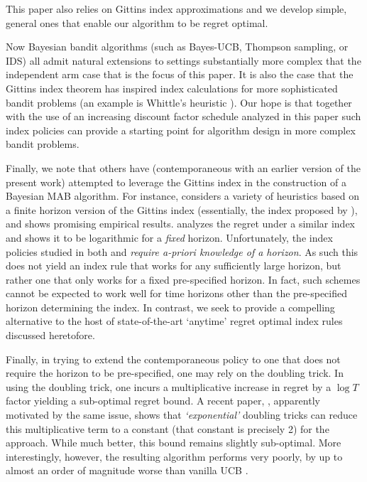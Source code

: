 This paper also relies on Gittins index approximations and we develop simple, general ones that enable our algorithm to be regret optimal. 

{\color{blue}
Now Bayesian bandit algorithms (such as Bayes-UCB, Thompson sampling, or IDS) all admit natural extensions to settings substantially more complex that the independent arm case that is the focus of this paper. It is also the case that the Gittins index theorem has inspired index calculations for more sophisticated bandit problems (an example is Whittle's heuristic  \citep{whittle1988restless}). Our hope is that together with the use of an increasing discount factor schedule analyzed in this paper such index policies can provide a starting point for algorithm design in more complex bandit problems. 
}

Finally, we note that others have (contemporaneous with an earlier version of the present work) attempted to leverage the Gittins index in the construction of a Bayesian MAB algorithm. For instance, \cite{kaufmann2016bayesian} considers a variety of heuristics based on a finite horizon version of the Gittins index (essentially, the index proposed by \cite{bradt1956sequential}), and shows promising empirical results. \cite{lattimore2016bayesregret} analyzes the regret under a similar index and shows it to be logarithmic for a {\em fixed} horizon. Unfortunately, the index policies studied in both \citep{kaufmann2016bayesian} and \citep{lattimore2016bayesregret} {\em require a-priori knowledge of a horizon}. As such this does not yield an index rule that works for any sufficiently large horizon, but rather one that only works for a fixed pre-specified horizon. In fact, such schemes cannot be expected to work well for time horizons other than the pre-specified horizon determining the index. In contrast, we seek to provide a compelling alternative to the host of state-of-the-art `anytime' regret optimal index rules discussed heretofore. 

{\color{blue} Finally, in trying to extend the contemporaneous \cite{lattimore2016bayesregret} policy to one that does not require the horizon to be pre-specified, one may rely on the doubling trick. In using the doubling trick, one incurs a multiplicative increase in regret by a $\log T$ factor yielding a sub-optimal regret bound. A recent paper, \citep{besson2018doubling}, apparently motivated by the same issue, shows that {\em `exponential'} doubling tricks can reduce this multiplicative term to a constant (that constant is precisely 2) for the \cite{lattimore2016bayesregret} approach. While much better, this bound remains slightly sub-optimal. More interestingly, however, the resulting algorithm performs very poorly, by up to almost an order of magnitude worse than vanilla UCB \citep{besson2018doubling}.}



